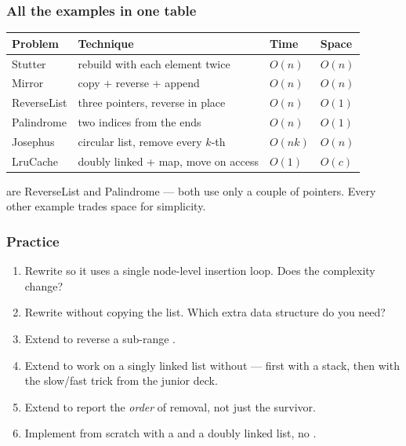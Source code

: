 \documentclass[aspectratio=169,10pt,compress]{beamer}
\begin{document}
\begin{frame}[t,fragile] \frametitle{All the examples in one table}
  \begin{center}\footnotesize
  \begin{tabular}{@{}L{0.14\textwidth}L{0.34\textwidth}L{0.20\textwidth}L{0.18\textwidth}@{}}
    \toprule
    \textbf{Problem} & \textbf{Technique} & \textbf{Time} & \textbf{Space} \\
    \midrule
    Stutter     & rebuild with each element twice           & $O(n)$     & $O(n)$ \\
    Mirror      & copy + reverse + append                    & $O(n)$     & $O(n)$ \\
    ReverseList & three pointers, reverse in place           & $O(n)$     & $O(1)$ \\
    Palindrome  & two indices from the ends                  & $O(n)$     & $O(1)$ \\
    Josephus    & circular list, remove every $k$-th         & $O(nk)$    & $O(n)$ \\
    LruCache    & doubly linked + map, move on access        & $O(1)$     & $O(c)$ \\
    \bottomrule
  \end{tabular}
  \end{center}
  \vspace{0.4em}
  \small
   are ReverseList and
  Palindrome — both use only a couple of pointers. Every other example
  trades space for simplicity.
\end{frame}




\begin{frame}[t,fragile] \frametitle{Practice}
  \begin{enumerate}\small
    \item Rewrite  so it uses a single node-level
          insertion loop. Does the complexity change?
    \item Rewrite  without copying the list. Which
          extra data structure do you need?
    \item Extend  to reverse a sub-range
          \hCode{[lo, hi)}.
    \item Extend  to work on a singly linked list
          without  — first with a stack, then with
          the slow/fast trick from the junior deck.
    \item Extend  to report the \emph{order} of
          removal, not just the survivor.
    \item Implement  from scratch with a
           and a doubly linked list, no
          .
  \end{enumerate}
\end{frame}
\end{document}
